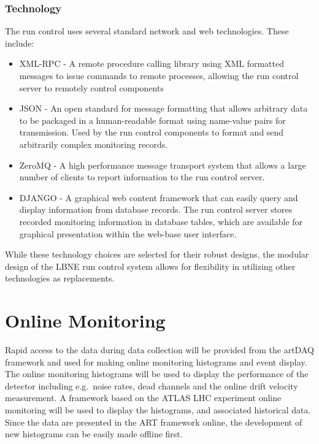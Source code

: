 \subsubsection{Technology}
The run control uses several standard network and
web technologies.  These include:
\begin{itemize}
\item{XML-RPC - A remote procedure calling library using XML
    formatted messages to issue commands to remote processes, allowing
    the run control server to remotely control components}
\item{JSON - An open standard for message formatting that allows
    arbitrary data to be packaged in a human-readable format using
    name-value pairs for transmission.  Used by the run control
    components to format and send arbitrarily complex monitoring
    records.}
\item{ZeroMQ - A high performance message transport system that allows
    a large number of clients to report information to the run control
    server.}
\item{DJANGO - A graphical web content framework that can easily query
    and display information from database records.  The run control server
    stores recorded monitoring information in database tables, which
    are available for graphical presentation within the web-base user
    interface.}
\end{itemize}
While these technology choices are selected for their robust designs,
the modular design of the LBNE run control system allows for
flexibility in utilizing other technologies as replacements.

\section{Online Monitoring}
\label{sec:daq_om}

Rapid access to the data during data collection will be provided from
the artDAQ framework and used for making online monitoring histograms
and event display.  The online monitoring histograms will be used to
display the performance of the detector including e.g.\ noise rates,
dead channels and the online drift velocity measurement.  A framework
based on the ATLAS LHC experiment online monitoring will be used to
display the histograms, and associated historical data.  Since the
data are presented in the ART framework online, the development of new
histograms can be easily made offline first.


